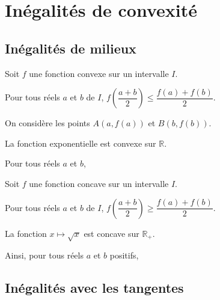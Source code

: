 \documentclass[11pt,fleqn, openany]{book} %
\begin{document}
\newpage
\section{Inégalités de convexité}

\subsection{Inégalités de milieux}


\begin{proposition}Soit $f$ une fonction convexe sur un intervalle $I$. 

Pour tous réels $a$ et $b$ de $I$, $ f\left( \dfrac{a+b}{2} \right) \leqslant \dfrac{f(a)+f(b)}{2}$.
\end{proposition}

\begin{demonstration}On considère les points $A(a,f(a))$ et $B(b,f(b))$. 




\end{demonstration}

\begin{example}La fonction exponentielle est convexe sur $\mathbb{R}$. 

Pour tous réels $a$ et $b$,\end{example}

\begin{proposition}Soit $f$ une fonction concave sur un intervalle $I$. 

Pour tous réels $a$ et $b$ de $I$, $ f\left( \dfrac{a+b}{2} \right) \geqslant \dfrac{f(a)+f(b)}{2}$.
\end{proposition}

\begin{example}La fonction $x\mapsto \sqrt{x}$ est concave sur $\mathbb{R}_+$. 

Ainsi, pour tous réels $a$ et $b$ positifs,\end{example}

\subsection{Inégalités avec les tangentes}
\end{document}
